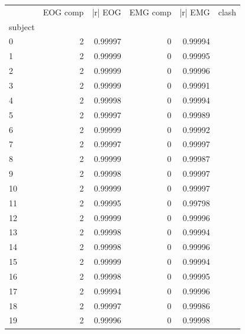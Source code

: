 \begin{tabular}{lrrrrl}
\toprule
 & EOG comp & |r| EOG & EMG comp & |r| EMG & clash \\
subject &  &  &  &  &  \\
\midrule
0 & 2 & 0.99997 & 0 & 0.99994 &  \\
1 & 2 & 0.99999 & 0 & 0.99995 &  \\
2 & 2 & 0.99999 & 0 & 0.99996 &  \\
3 & 2 & 0.99999 & 0 & 0.99991 &  \\
4 & 2 & 0.99998 & 0 & 0.99994 &  \\
5 & 2 & 0.99997 & 0 & 0.99989 &  \\
6 & 2 & 0.99999 & 0 & 0.99992 &  \\
7 & 2 & 0.99997 & 0 & 0.99997 &  \\
8 & 2 & 0.99999 & 0 & 0.99987 &  \\
9 & 2 & 0.99998 & 0 & 0.99997 &  \\
10 & 2 & 0.99999 & 0 & 0.99997 &  \\
11 & 2 & 0.99995 & 0 & 0.99798 &  \\
12 & 2 & 0.99999 & 0 & 0.99996 &  \\
13 & 2 & 0.99998 & 0 & 0.99994 &  \\
14 & 2 & 0.99998 & 0 & 0.99996 &  \\
15 & 2 & 0.99999 & 0 & 0.99994 &  \\
16 & 2 & 0.99998 & 0 & 0.99995 &  \\
17 & 2 & 0.99994 & 0 & 0.99996 &  \\
18 & 2 & 0.99997 & 0 & 0.99986 &  \\
19 & 2 & 0.99996 & 0 & 0.99998 &  \\
\bottomrule
\end{tabular}
